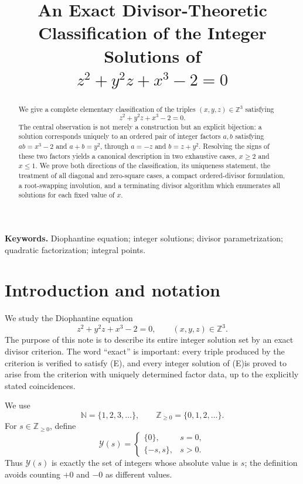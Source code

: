 \documentclass[11pt,a4paper]{article}
\title{\textbf{An Exact Divisor-Theoretic Classification of the Integer Solutions of}
\\[3mm]
$z^2+y^2z+x^3-2=0$}
\author{}
\date{}
\theoremstyle{definition}
\theoremstyle{remark}
\newcommand{\Z}{\mathbb Z}
\newcommand{\N}{\mathbb N}
\newcommand{\Yset}{\mathcal Y}
\newcommand{\eqE}{\textup{(E)}}
\begin{document}
\maketitle

\begin{abstract}
We give a complete elementary classification of the triples
$(x,y,z)\in\Z^3$ satisfying
\[
 z^2+y^2z+x^3-2=0.
\]
The central observation is not merely a construction but an explicit
bijection: a solution corresponds uniquely to an ordered pair of integer
factors $a,b$ satisfying
$ab=x^3-2$ and $a+b=y^2$, through
$a=-z$ and $b=z+y^2$.  Resolving the signs of these two factors yields a
canonical description in two exhaustive cases, $x\geq 2$ and $x\leq 1$.
We prove both directions of the classification, its uniqueness statement,
the treatment of all diagonal and zero-square cases, a compact ordered-divisor
formulation, a root-swapping involution, and a terminating divisor algorithm
which enumerates all solutions for each fixed value of $x$.
\end{abstract}

\medskip
\noindent\textbf{Keywords.}
Diophantine equation; integer solutions; divisor parametrization; quadratic
factorization; integral points.

\section{Introduction and notation}

We study the Diophantine equation
\begin{equation*}
 z^2+y^2z+x^3-2=0,
 \qquad (x,y,z)\in\Z^3.
 \tag{E}
\end{equation*}
The purpose of this note is to describe its entire integer solution set by an
exact divisor criterion.  The word ``exact'' is important: every triple
produced by the criterion is verified to satisfy \eqE, and every
integer solution of \eqE is proved to arise from the criterion with
uniquely determined factor data, up to the explicitly stated coincidences.

We use
\[
 \N=\{1,2,3,\ldots\},
 \qquad
 \Z_{\geq 0}=\{0,1,2,\ldots\}.
\]
For $s\in\Z_{\geq0}$, define
\begin{equation}
 \Yset(s)=
 \begin{cases}
  \{0\},&s=0,\\
  \{-s,s\},&s>0.
 \end{cases}
 \label{eq:Yset}
\end{equation}
Thus $\Yset(s)$ is exactly the set of integers whose absolute value is $s$;
the definition avoids counting $+0$ and $-0$ as different values.
\end{document}
